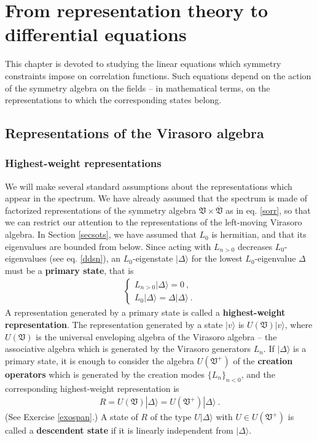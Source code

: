 \documentclass[12pt, a4paper, notitlepage, twoside]{report}
\numberwithin{equation}{section}
\theoremstyle{break}
\begin{document}
\chapter{From representation theory to differential equations \label{secccs}}

This chapter is devoted to studying the linear equations which symmetry constraints impose on correlation functions.
Such equations depend on the action of the symmetry algebra on the fields -- in mathematical terms, on the representations to which the corresponding states belong. 

\section{Representations of the Virasoro algebra \label{secrep}}

\subsection{Highest-weight representations}

We will make several standard assumptions about the representations which appear in the spectrum.
We have already assumed that the spectrum is made of factorized representations of the symmetry algebra $\mathfrak{V}\times \overline{\mathfrak{V}}$ as in eq. \eqref{sorr}, so that we can restrict our attention to the representations of the left-moving Virasoro algebra.
In Section \ref{secsots}, we have assumed that $L_0$ is hermitian, and that its eigenvalues are bounded from below.
Since acting with $L_{n>0}$ decreases $L_0$-eigenvalues (see eq. \eqref{ddsn}), an $L_0$-eigenstate $|\Delta\rangle$ for the lowest $L_0$-eigenvalue $\Delta$ must be a \textbf{\boldmath primary state}, that is
\begin{align}
 \boxed{\left\{\begin{array}{l}  L_{n>0}|\Delta\rangle = 0\ , \\ L_0 |\Delta\rangle = \Delta |\Delta\rangle\ .\end{array}\right. }
\label{lvlv}
\end{align}
A representation generated by a primary state is called a \textbf{\boldmath highest-weight representation}.
The representation generated by a state $|v\rangle$ is $U(\mathfrak{V})|v\rangle$, where $U(\mathfrak{V})$ is the universal enveloping algebra of the Virasoro algebra -- the associative algebra which is generated by the Virasoro generators $L_n$.
If $|\Delta\rangle$ is a primary state, it is enough to consider the algebra $U(\mathfrak{V}^+)$ of the \textbf{\boldmath creation operators} which is generated by the creation modes $\{L_n\}_{n<0}$, and the corresponding highest-weight representation is 
\begin{align}
 R = U(\mathfrak{V})|\Delta\rangle =U(\mathfrak{V}^+)|\Delta\rangle\ .
\label{ruv}
\end{align}
(See Exercise \ref{exospan}.)
A state of $R$ of the type $U|\Delta\rangle$ with $U\in U(\mathfrak{V}^+)$ is called a \textbf{\boldmath descendent state} if it is linearly independent from $|\Delta\rangle$.
\end{document}
